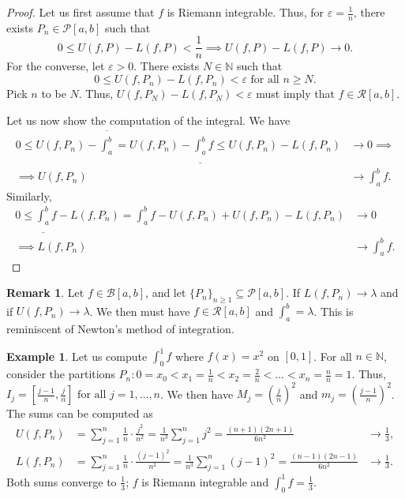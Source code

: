\documentclass[15pt,a4paper]{book}
\theoremstyle{definition}
\newtheorem{example}[theorem]{Example}
\newtheorem{remark}[theorem]{Remark}
\newcommand{\N}{\mathbb{N}} %
\newcommand{\cP}{\mathcal{P}}
\newcommand{\cR}{\mathcal{R}}
\newcommand{\cB}{\mathcal{B}}
\begin{document}
\begin{proof}
    Let us first assume that $f$ is Riemann integrable. Thus, for $\varepsilon = \frac{1}{n}$, there exists $P_{n} \in \cP[a,b]$ such that
    \begin{equation}
        0 \leq U(f,P) - L(f,P) < \frac{1}{n}
        \implies U(f,P) - L(f,P) \to 0.
    \end{equation}
    For the converse, let $\varepsilon > 0$. There exists $N \in \N$ such that
    \begin{equation}
        0 \leq U(f,P_{n}) - L(f,P_{n}) < \varepsilon \text{ for all } n \geq N.
    \end{equation}
    Pick $n$ to be $N$. Thus, $U(f,P_{N}) - L(f,P_{N}) < \varepsilon$ must imply that $f \in \cR[a,b]$.

    Let us now show the computation of the integral. We have
    \begin{align}
        0 \leq U(f,P_{n}) - \overline{\int_{a}^{b}} = U(f,P_{n}) - \underline{\int_{a}^{b}} f \leq U(f,P_{n}) - L(f,P_{n}) &\to 0 \implies \\
        \implies U(f,P_{n}) &\to \int_{a}^{b}f.
    \end{align}
    Similarly,
    \begin{align}
        0 \leq \underline{\int_{a}^{b}} f - L(f,P_{n}) = \int_{a}^{b} f - U(f,P_{n}) + U(f,P_{n}) - L(f,P_{n}) &\to 0 \\
        \implies L(f,P_{n}) &\to \int_{a}^{b} f.
    \end{align}
\end{proof}
\begin{remark}
    Let $f \in \cB[a,b]$, and let $\{P_{n}\}_{n \geq 1} \subseteq \cP[a,b]$. If $L(f,P_{n}) \to \lambda$ and if $U(f,P_{n}) \to \lambda$. We then must have $f \in \cR[a,b]$ and $\int_{a}^{b} = \lambda$. This is reminiscent of Newton's method of integration.
\end{remark}
\begin{example}
    Let us compute $\int_{0}^{1}f$ where $f(x) = x^{2}$ on $[0,1]$. For all $n \in \N$, consider the partitions $P_{n} : 0 = x_{0} < x_{1} = \frac{1}{n} < x_{2} = \frac{2}{n} < \ldots < x_{n} = \frac{n}{n} = 1$. Thus, $I_{j} = \left[ \frac{j-1}{n}, \frac{j}{n} \right] \text{ for all } j = 1, \ldots, n$. We then have $M_{j} = (\frac{j}{n})^{2}$ and $m_{j} = (\frac{j-1}{n})^{2}$. The sums can be computed as
    \begin{align}
        U(f,P_{n}) &= \sum_{j=1}^{n} \frac{1}{n} \cdot \frac{j^{2}}{n^{2}} = \frac{1}{n^{3}} \sum_{j=1}^{n} j^{2} = \frac{(n+1)(2n+1)}{6n^{2}} &\to \frac{1}{3}, \\
        L(f,P_{n}) &= \sum_{j=1}^{n} \frac{1}{n} \cdot \frac{(j-1)^{2}}{n^{2}} = \frac{1}{n^{3}} \sum_{j=1}^{n} (j-1)^{2} = \frac{(n-1)(2n-1)}{6n^{2}} &\to \frac{1}{3}.
    \end{align}
    Both sums converge to $\frac{1}{3}$; $f$ is Riemann integrable and $\int_{0}^{1} f = \frac{1}{3}$.
\end{example}
\end{document}
